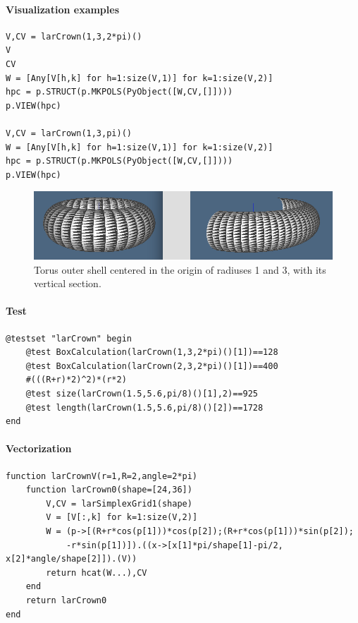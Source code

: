 \documentclass{article}
\begin{document}
\paragraph{Visualization examples}

\begin{verbatim}
V,CV = larCrown(1,3,2*pi)()
V
CV
W = [Any[V[h,k] for h=1:size(V,1)] for k=1:size(V,2)]
hpc = p.STRUCT(p.MKPOLS(PyObject([W,CV,[]])))
p.VIEW(hpc)

V,CV = larCrown(1,3,pi)()
W = [Any[V[h,k] for h=1:size(V,1)] for k=1:size(V,2)]
hpc = p.STRUCT(p.MKPOLS(PyObject([W,CV,[]])))
p.VIEW(hpc)
\end{verbatim}

\begin{figure}[htbp] 
\centering 
\includegraphics[scale=.46]{larCrown.png} 
\caption{Torus outer shell centered in the origin of radiuses 1 and 3, with its vertical section.} 
\end{figure}

\paragraph{Test}
\begin{Verbatim}
@testset "larCrown" begin
	@test BoxCalculation(larCrown(1,3,2*pi)()[1])==128
	@test BoxCalculation(larCrown(2,3,2*pi)()[1])==400
	#(((R+r)*2)^2)*(r*2)
	@test size(larCrown(1.5,5.6,pi/8)()[1],2)==925
	@test length(larCrown(1.5,5.6,pi/8)()[2])==1728
end
\end{Verbatim}

\paragraph{Vectorization}

\begin{verbatim}
function larCrownV(r=1,R=2,angle=2*pi)
    function larCrown0(shape=[24,36])
        V,CV = larSimplexGrid1(shape)
        V = [V[:,k] for k=1:size(V,2)]
        W = (p->[(R+r*cos(p[1]))*cos(p[2]);(R+r*cos(p[1]))*sin(p[2]);
            -r*sin(p[1])]).((x->[x[1]*pi/shape[1]-pi/2, x[2]*angle/shape[2]]).(V))
        return hcat(W...),CV
    end
    return larCrown0    
end
\end{verbatim}
\end{document}
